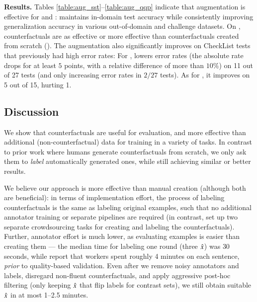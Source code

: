 \textbf{Results.}
Tables \ref{table:aug_sst}--\ref{table:aug_qqp} indicate that \sysname augmentation is effective for \sst and \nli: \maug maintains in-domain test accuracy while consistently improving generalization accuracy in various out-of-domain and challenge datasets. 
On \nli, \sysname counterfactuals are as effective or more effective than counterfactuals created from scratch (\mcad).
The augmentation also significantly improves on CheckList tests that previously had high error rates: 
For \qqp, \sysname lowers error rates (the absolute rate drops for at least $5$ points, with a relative difference of more than $10\%$) on 11 out of 27 tests (and only increasing error rates in $2/27$ tests).
As for \sst, it improves on 5 out of 15, hurting 1.


\subsection{Discussion}
\label{subsec:label_efficiency}
We show that \sysname counterfactuals are useful for evaluation, and more effective than additional (non-counterfactual) data for training in a variety of tasks. 
In contrast to prior work where humans generate counterfactuals from scratch, we only ask them to \emph{label} automatically generated ones, while still achieving similar or better results.

We believe our approach is more effective than manual creation (although both are beneficial): in terms of implementation effort, the process of labeling counterfactuals is the same as labeling original examples, such that no additional annotator training or separate pipelines are required (in contrast, \citet{kaushik2019learning} set up two separate crowdsourcing tasks for creating and labeling the counterfactuals). 
Further, annotator effort is much lower, as evaluating examples is easier than creating them --- the median time for labeling one round (three $\hat{x}$) was $30$ seconds, while \citet{kaushik2019learning} report that workers spent roughly 4 minutes on each \nli sentence, \emph{prior} to quality-based validation.
Even after we remove noisy annotators and labels, disregard non-fluent counterfactuals, and apply aggressive post-hoc filtering (\eg only keeping $\hat{x}$ that flip labels for contrast sets), we still obtain suitable $\hat{x}$ in at most 1--2.5 minutes.

